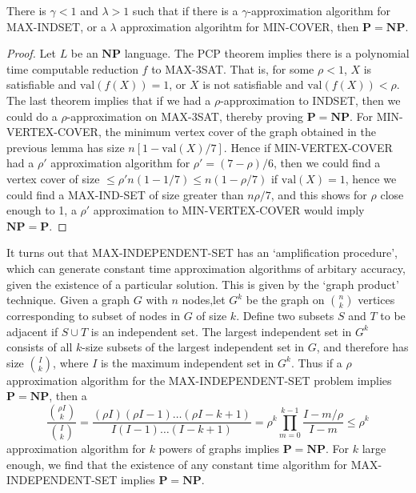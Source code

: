 \begin{theorem}
    There is $\gamma < 1$ and $\lambda > 1$ such that if there is a $\gamma$-approximation algorithm for MAX-INDSET, or a $\lambda$ approximation algorihtm for MIN-COVER, then $\mathbf{P} = \mathbf{NP}$.
\end{theorem}
\begin{proof}
    Let $L$ be an $\mathbf{NP}$ language. The PCP theorem implies there is a polynomial time computable reduction $f$ to MAX-3SAT. That is, for some $\rho < 1$, $X$ is satisfiable and $\text{val}(f(X)) = 1$, or $X$ is not satisfiable and $\text{val}(f(X)) < \rho$. The last theorem implies that if we had a $\rho$-approximation to INDSET, then we could do a $\rho$-approximation on MAX-3SAT, thereby proving $\mathbf{P} = \mathbf{NP}$. For MIN-VERTEX-COVER, the minimum vertex cover of the graph obtained in the previous lemma has size $n[1 - \text{val}(X)/7]$. Hence if MIN-VERTEX-COVER had a $\rho'$ approximation algorithm for $\rho' = (7 - \rho)/6$, then we could find a vertex cover of size $\leq \rho' n (1 - 1/7) \leq n (1 - \rho/7)$ if $\text{val}(X) = 1$, hence we could find a MAX-IND-SET of size greater than $n \rho/7$, and this shows for $\rho$ close enough to 1, a $\rho'$ approximation to MIN-VERTEX-COVER would imply $\mathbf{NP} = \mathbf{P}$.
\end{proof}

It turns out that MAX-INDEPENDENT-SET has an `amplification procedure', which can generate constant time approximation algorithms of arbitary accuracy, given the existence of a particular solution. This is given by the `graph product' technique. Given a graph $G$ with $n$ nodes,let $G^k$ be the graph on ${n \choose k}$ vertices corresponding to subset of nodes in $G$ of size $k$. Define two subsets $S$ and $T$ to be adjacent if $S \cup T$ is an independent set. The largest independent set in $G^k$ consists of all $k$-size subsets of the largest independent set in $G$, and therefore has size ${I \choose k}$, where $I$ is the maximum independent set in $G^k$. Thus if a $\rho$ approximation algorithm for the MAX-INDEPENDENT-SET problem implies $\mathbf{P} = \mathbf{NP}$, then a
%
\[ \frac{{\rho I \choose k}}{{I \choose k}} = \frac{(\rho I)(\rho I - 1) \dots (\rho I - k + 1)}{I(I-1) \dots (I-k+1)} = \rho^k \prod_{m = 0}^{k-1} \frac{I - m/\rho}{I - m} \leq \rho^k \]
%
approximation algorithm for $k$ powers of graphs implies $\mathbf{P} = \mathbf{NP}$. For $k$ large enough, we find that the existence of any constant time algorithm for MAX-INDEPENDENT-SET implies $\mathbf{P} = \mathbf{NP}$.

